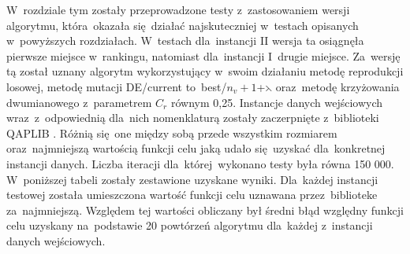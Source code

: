 W~rozdziale tym zostały przeprowadzone testy z~zastosowaniem wersji algorytmu, która~okazała się~działać najskuteczniej w~testach opisanych w~powyższych rozdziałach. W~testach dla~instancji II wersja ta osiągnęła pierwsze miejsce w~rankingu, natomiast dla~instancji I~drugie miejsce. Za~wersję tą został uznany algorytm wykorzystujący w~swoim działaniu metodę reprodukcji losowej, metodę mutacji  DE/current to~best/$n_{v}+1$+$\leftthreetimes$ oraz~metodę krzyżowania dwumianowego z~parametrem $C_{r}$ równym 0,25. Instancje danych wejściowych wraz~z~odpowiednią dla~nich nomenklaturą zostały zaczerpnięte z~biblioteki QAPLIB \cite{qaplib}. Różnią się~one między sobą przede wszystkim rozmiarem oraz~najmniejszą wartością funkcji celu jaką udało się~uzyskać dla~konkretnej instancji danych. Liczba iteracji dla~której~wykonano testy była równa 150 000. W~poniższej tabeli zostały zestawione uzyskane wyniki. Dla~każdej instancji testowej została umieszczona wartość funkcji celu uznawana przez~biblioteke \cite{qaplib} za~najmniejszą. Względem tej wartości obliczany był średni błąd względny funkcji celu uzyskany na~podstawie 20 powtórzeń algorytmu dla~każdej z~instancji danych wejściowych.

\begin{table}[h!]
\begin{center}
\caption{Zestawienie działania algorytmu dla poszczególnych instancji danych wejściowych.}
\label{malezestawienie}
\end{center}
\end{table}

